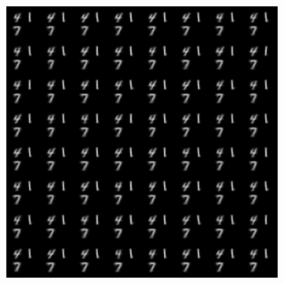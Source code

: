 \documentclass{article}
\begin{document}
\begin{figure}[!h]
\begin{subfigure}[b]{.24\linewidth}
        \caption{}
    \end{subfigure}
    \begin{subfigure}[b]{.24\linewidth}
        \centering
        \includegraphics[width=\linewidth]{multimnist_mmvae_condition_on_image_417_image_sample.png}
        \caption{}
    \end{subfigure}


\end{figure}
\end{document}
